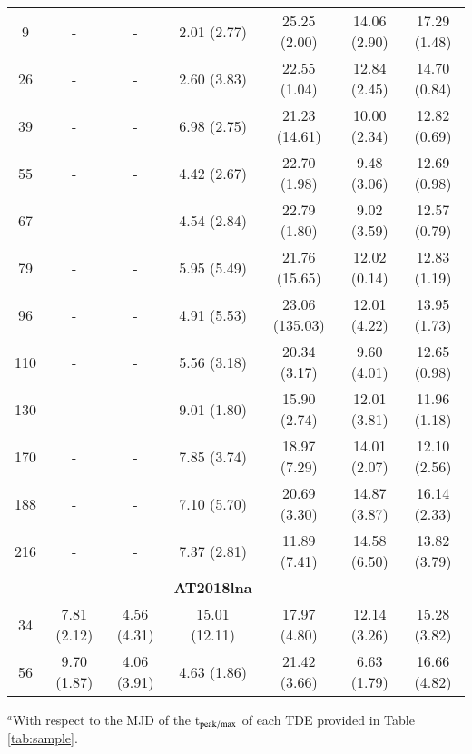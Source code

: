\documentclass[structabstract]{aa}
\begin{document}
\begin{small}
\begin{longtable}{c c c c c c c}
9	&	-	&	-	&	2.01 (2.77)	&	25.25 (2.00)	&	14.06 (2.90)	&	17.29 (1.48)  \\
26	&	-	&	-	&	2.60 (3.83)	&	22.55 (1.04)	&	12.84 (2.45)	&	14.70 (0.84)  \\
39	&	-	&	-	&	6.98 (2.75)	&	21.23 (14.61)	&	10.00 (2.34)	&	12.82 (0.69)  \\
55	&	-	&	-	&	4.42 (2.67)	&	22.70 (1.98)	&	9.48 (3.06)	&	12.69 (0.98)  \\
67	&	-	&	-	&	4.54 (2.84)	&	22.79 (1.80)	&	9.02 (3.59)	&	12.57 (0.79)  \\
79	&	-	&	-	&	5.95 (5.49)	&	21.76 (15.65)	&	12.02 (0.14)	&	12.83 (1.19)  \\
96	&	-	&	-	&	4.91 (5.53)	&	23.06 (135.03)	&	12.01 (4.22)	&	13.95 (1.73)  \\
110	&	-	&	-	&	5.56 (3.18)	&	20.34 (3.17)	&	9.60 (4.01)	&	12.65 (0.98)  \\
130	&	-	&	-	&	9.01 (1.80)	&	15.90 (2.74)	&	12.01 (3.81)	&	11.96 (1.18)  \\
170	&	-	&	-	&	7.85 (3.74)	&	18.97 (7.29)	&	14.01 (2.07)	&	12.10 (2.56)  \\
188	&	-	&	-	&	7.10 (5.70)	&	20.69 (3.30)	&	14.87 (3.87)	&	16.14 (2.33)  \\
216	&	-	&	-	&	7.37 (2.81)	&	11.89 (7.41)	&	14.58 (6.50)	&	13.82 (3.79)  \\ \hline
	&		&		&	\textbf{AT2018lna}	&		&		&	\\ \hline
34	&	7.81 (2.12)	&	4.56 (4.31)	&	15.01 (12.11)	&	17.97 (4.80)	&	12.14 (3.26)	&	15.28 (3.82)  \\
56	&	9.70 (1.87)	&	4.06 (3.91)	&	4.63 (1.86)	&	21.42 (3.66)	&	6.63 (1.79)	&	16.66 (4.82)  \\ \hline

\end{longtable}
$^{a}$With respect to the MJD of the t$_{\rm peak/max}$ of each TDE provided in Table \ref{tab:sample}. %
\end{small}
\end{document}
